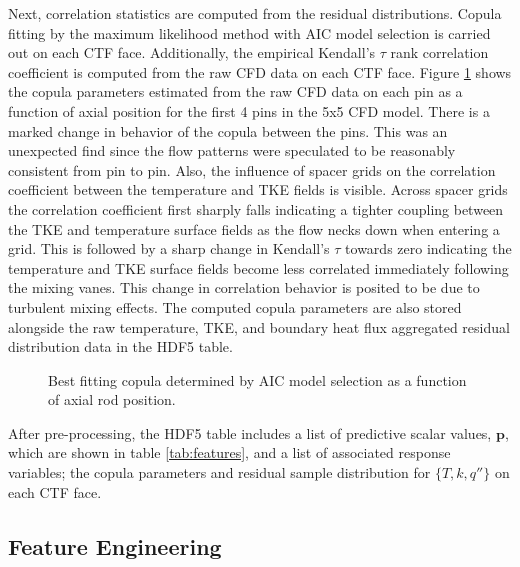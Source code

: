 Next, correlation statistics are computed from the residual distributions.
Copula fitting by the maximum likelihood method with AIC model selection is carried out on each CTF face.  Additionally, the empirical Kendall's $\tau$ rank correlation coefficient is computed from the raw CFD data on each CTF face. Figure \ref{fig:copula_predicted} shows the copula parameters estimated from the raw CFD data on each pin as a function of axial position for the first 4 pins in the 5x5 CFD model.  There is a marked change in behavior of the copula between the pins.  This was an unexpected find since the flow patterns were speculated to be reasonably consistent from pin to pin.  Also, the influence of spacer grids on the correlation coefficient between the temperature and TKE fields is visible.  Across spacer grids the correlation coefficient first sharply falls indicating a tighter coupling between the TKE and temperature surface fields as the flow necks down when entering a grid.  This is followed by a sharp change in Kendall's $\tau$ towards zero indicating the temperature and TKE surface fields become less correlated immediately following the mixing vanes.  This change in correlation behavior is posited to be due to turbulent mixing effects.  The computed copula parameters are also stored alongside the raw temperature, TKE, and boundary heat flux aggregated residual distribution data in the HDF5 table.

\begin{figure}[H]%
    \centering
    \qquad
    \qquad
    \qquad
    \qquad
    \caption[Best fitting copula to CFD data.]{Best fitting copula determined by AIC model selection as a function of axial rod position.}%
    \label{fig:copula_predicted}%
\end{figure}

After pre-processing, the HDF5 table includes a list of predictive scalar values, $\mathbf p$, which are shown in table \ref{tab:features}, and a list of associated response variables; the copula parameters and residual sample distribution for $\{T,k,q''\}$ on each CTF face.

\subsection{Feature Engineering}

